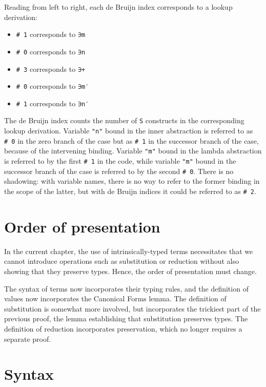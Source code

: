 Reading from left to right, each de Bruijn index corresponds to a lookup
derivation:

\begin{itemize}
\tightlist
\item
  \texttt{\#\ 1} corresponds to \texttt{∋m}
\item
  \texttt{\#\ 0} corresponds to \texttt{∋n}
\item
  \texttt{\#\ 3} corresponds to \texttt{∋+}
\item
  \texttt{\#\ 0} corresponds to \texttt{∋m′}
\item
  \texttt{\#\ 1} corresponds to \texttt{∋n′}
\end{itemize}

The de Bruijn index counts the number of \texttt{S} constructs in the
corresponding lookup derivation. Variable \texttt{"n"} bound in the
inner abstraction is referred to as \texttt{\#\ 0} in the zero branch of
the case but as \texttt{\#\ 1} in the successor branch of the case,
because of the intervening binding. Variable \texttt{"m"} bound in the
lambda abstraction is referred to by the first \texttt{\#\ 1} in the
code, while variable \texttt{"m"} bound in the successor branch of the
case is referred to by the second \texttt{\#\ 0}. There is no shadowing:
with variable names, there is no way to refer to the former binding in
the scope of the latter, but with de Bruijn indices it could be referred
to as \texttt{\#\ 2}.

\hypertarget{order-of-presentation}{%
\section{Order of presentation}\label{order-of-presentation}}

In the current chapter, the use of intrinsically-typed terms
necessitates that we cannot introduce operations such as substitution or
reduction without also showing that they preserve types. Hence, the
order of presentation must change.

The syntax of terms now incorporates their typing rules, and the
definition of values now incorporates the Canonical Forms lemma. The
definition of substitution is somewhat more involved, but incorporates
the trickiest part of the previous proof, the lemma establishing that
substitution preserves types. The definition of reduction incorporates
preservation, which no longer requires a separate proof.

\hypertarget{syntax}{%
\section{Syntax}\label{syntax}}

